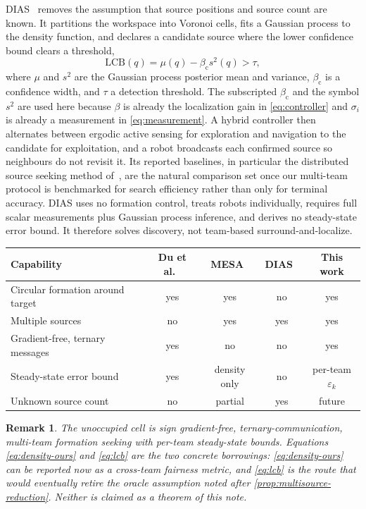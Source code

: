 \documentclass[11pt]{article}
\newtheorem{remark}{Remark}
\begin{document}
DIAS~\cite{chen2025dias} removes the assumption that source positions and source count are known. It partitions the workspace into Voronoi cells, fits a Gaussian process to the density function, and declares a candidate source where the lower confidence bound clears a threshold,
\begin{equation}\label{eq:lcb}
    \mathrm{LCB}(q)=\mu(q)-\beta_{\mathrm{c}}s^2(q)>\tau ,
\end{equation}
where $\mu$ and $s^2$ are the Gaussian process posterior mean and variance, $\beta_{\mathrm{c}}$ is a confidence width, and $\tau$ a detection threshold. The subscripted $\beta_{\mathrm{c}}$ and the symbol $s^2$ are used here because $\beta$ is already the localization gain in \eqref{eq:controller} and $\sigma_i$ is already a measurement in \eqref{eq:measurement}.
A hybrid controller then alternates between ergodic active sensing for exploration and navigation to the candidate for exploitation, and a robot broadcasts each confirmed source so neighbours do not revisit it. Its reported baselines, in particular the distributed source seeking method of~\cite{du2021doss}, are the natural comparison set once our multi-team protocol is benchmarked for search efficiency rather than only for terminal accuracy. DIAS uses no formation control, treats robots individually, requires full scalar measurements plus Gaussian process inference, and derives no steady-state error bound. It therefore solves discovery, not team-based surround-and-localize.

\begin{center}
\begin{tabular}{lcccc}
\hline
Capability & Du et al.~\cite{du2024} & MESA~\cite{turgeman2018} & DIAS~\cite{chen2025dias} & This work \\
\hline
Circular formation around target & yes & yes & no & yes \\
Multiple sources & no & yes & yes & yes \\
Gradient-free, ternary messages & yes & no & no & yes \\
Steady-state error bound & yes & density only & no & per-team $\varepsilon_k$ \\
Unknown source count & no & partial & yes & future \\
\hline
\end{tabular}
\end{center}

\begin{remark}
The unoccupied cell is sign gradient-free, ternary-communication, multi-team formation seeking with per-team steady-state bounds. Equations \eqref{eq:density-ours} and \eqref{eq:lcb} are the two concrete borrowings: \eqref{eq:density-ours} can be reported now as a cross-team fairness metric, and \eqref{eq:lcb} is the route that would eventually retire the oracle assumption noted after \cref{prop:multisource-reduction}. Neither is claimed as a theorem of this note.
\end{remark}
\end{document}
